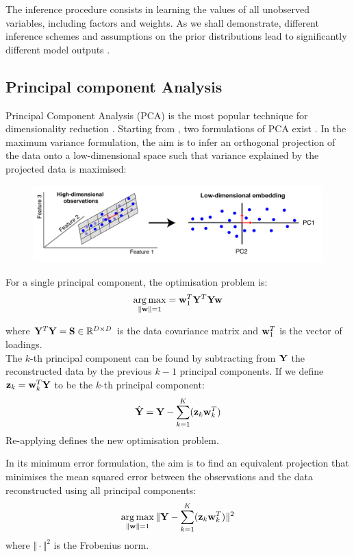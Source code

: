 The inference procedure consists in learning the values of all unobserved variables, including factors and weights. As we shall demonstrate, different inference schemes and assumptions on the prior distributions lead to significantly different model outputs \cite{Rattray2009}.

\subsection{Principal component Analysis} \label{section:pca}
Principal Component Analysis (PCA) is the most popular technique for dimensionality reduction \cite{Hotelling1933,Ringner2008}. Starting from , two formulations of PCA exist \cite{Bishop}. In the maximum variance formulation, the aim is to infer an orthogonal projection of the data onto a low-dimensional space such that variance explained by the projected data is maximised:

\begin{figure}[H]
	\centering
	\includegraphics[width=1.0\linewidth]{pca1}
	\caption[]{}
	\label{fig:pca1}
\end{figure}

For a single principal component, the optimisation problem is:
\begin{equation} \label{eq:pca}
	\operatorname*{arg\,max}_{\|{\bf w}\|=1} = {\bf w}_1^T {\bf Y}^T {\bf Y} {\bf w}
\end{equation}

where ${\bf Y}^T {\bf Y}={\bf S} \in \mathbb{R}^{D \times D}$ is the data covariance matrix and ${\bf w}_1^T$ is the vector of loadings. \\
The $k$-th principal component can be found by subtracting from ${\bf Y}$ the reconstructed data by the previous $k-1$ principal components. If we define ${\bf z}_k={\bf w}_k^T {\bf Y}$ to be the $k$-th principal component:
\[
	\hat{{\bf Y}} = {\bf Y} - \sum_{k=1}^{K} ({\bf z}_k {\bf w}_k^T)
\]
Re-applying  defines the new optimisation problem.

In its minimum error formulation, the aim is to find an equivalent projection that minimises the mean squared error between the observations and the data reconstructed using all principal components:
\[
	\operatorname*{arg\,max}_{\|{\bf w}\|=1} \Vert {\bf Y} - \sum_{k=1}^{K} ({\bf z}_k {\bf w}_k^T) \Vert^{2}
\]
where $\Vert \cdot \Vert^{2}$ is the Frobenius norm.

